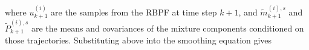 \documentclass[twocolumn]{autart}    %
\begin{document}
where $u_{k+1}^{(i)}$ are the samples from the RBPF at time step $k+1$, and $\tilde{m}_{k+1}^{(i),s}$ and $\tilde{P}_{k+1}^{(i),s}$ are the means and covariances of the mixture components conditioned on those trajectories.
%
%
%
Substituting above into the smoothing equation gives
%
\end{document}
